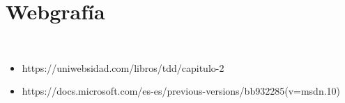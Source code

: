 \section{Webgrafía} 
\textbf{}\\
\begin{flushleft}

\begin{itemize}

	\item https://uniwebsidad.com/libros/tdd/capitulo-2
           \item https://docs.microsoft.com/es-es/previous-versions/bb932285(v=msdn.10)

\end{itemize} 


\end{flushleft}